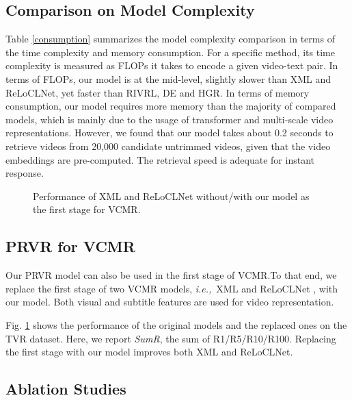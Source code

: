 \documentclass[sigconf]{acmart}
\newcommand{\ie}{\emph{i.e.,}~}
\begin{document}
\subsection{Comparison on Model Complexity}\label{sec:consumption}
Table \ref{consumption} summarizes the model complexity comparison in terms of the time complexity and memory consumption.
For a specific method, its time complexity is measured as FLOPs it takes to encode a given video-text pair. In terms of FLOPs, our model is at the mid-level, slightly slower than XML and ReLoCLNet, yet faster than RIVRL, DE and HGR. In terms of memory consumption, our model requires more memory than the majority of compared models, which is mainly due to the usage of transformer and multi-scale video representations. 
However, we found that our model takes about 0.2 seconds to retrieve videos from 20,000 candidate untrimmed videos, given that the video embeddings are pre-computed. The retrieval speed is adequate for instant response.




\begin{figure}[tb!]
\vspace{-4mm}
\caption{Performance of XML and ReLoCLNet without/with our model as the first stage for VCMR. 
}\label{fig:replace_experiment}
\end{figure}


\subsection{PRVR for VCMR}\label{ssec:prvr4vcmr}

Our PRVR model can also be used in the first stage of VCMR.To that end, we replace the first stage of two VCMR models, \ie XML \cite{lei2020tvr} and ReLoCLNet \cite{zhang2021video}, with our model. 
Both visual and subtitle features are used for video representation.

Fig. \ref{fig:replace_experiment} shows the performance of the original models and the replaced ones on the TVR dataset.
Here, we report \textit{SumR}, the sum of R1/R5/R10/R100. Replacing the first stage with our model improves both XML and  ReLoCLNet.





\subsection{Ablation Studies} \label{ssec:ablation}
\end{document}
